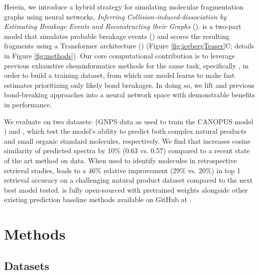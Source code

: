 \documentclass[journal=jcim,manuscript=article]{achemso}
\begin{document}
Herein, we introduce a hybrid strategy for simulating molecular fragmentation graphs using neural networks, \emph{Inferring Collision-induced-dissociation by Estimating Breakage Events and Reconstructing their Graphs} (\ourModel). \ourModel is a two-part model that simulates  probable breakage events (\ourModelOneShort) and scores the resulting fragments using a Transformer architecture (\ourModelTwoShort) (Figure \ref{fig:icebergTeaser}C; details in Figure \ref{fig:methods}). Our core computational contribution is to leverage previous exhaustive cheminformatics methods for the same task, specifically \MAGMA \cite{ridder_automatic_2014}, in order to build a %
training dataset, from which our model learns to make fast estimates prioritizing only likely bond breakages. In doing so, we lift \MAGMA and previous bond-breaking approaches into a neural network space with demonstrable benefits in performance. 

We evaluate \ourModel on two  datasets: \gnpsData (GNPS data \cite{wang_sharing_2016} as used to train the CANOPUS model \cite{duhrkop_systematic_2021}) and \nistData \cite{noauthor_tandem_nodate}, which test the model's ability to predict both complex natural products and small organic standard molecules, respectively. We find that \ourModel increases cosine similarity of predicted spectra by 10\%  (0.63 vs. 0.57) compared to a recent state of the art method on \gnpsData data. When used to identify molecules in retrospective retrieval studies, \ourModel leads to a 46\% relative improvement (29\% vs. 20\%) in top 1 retrieval accuracy on a challenging natural product dataset compared to the next best model tested.  \ourModel is fully open-sourced with pretrained weights alongside other existing prediction baseline methods available on GitHub at \codeUrl.



\section{Methods}
\label{sec:methods}

\subsection{Datasets}
\label{sec:methods_datasets}
\end{document}
